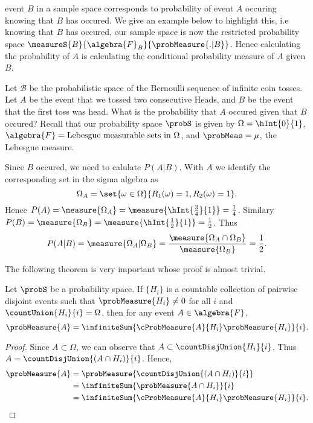 event $B$ in a sample space corresponds to probability of event $A$ occuring knowing that $B$ has occured. We
give an example below to highlight this, i.e knowing that $B$ has occured, our sample space is now the
restricted probability space $\measureS{B}{\algebra{F}_{B}}{\probMeasure{.|B}}$. Hence calculating the
probability of $A$ is calculating the conditional probability measure of $A$ given $B$.
\begin{Example}\label{ex:independece_2_events}
    Let $\mathcal{B}$ be the probabilistic space of the Bernoulli sequence of infinite coin tosses. Let $A$ be
    the event that we tossed two consecutive Heads, and $B$ be the event that the first toss was head. What is
    the probability that $A$ occured given that $B$ occured? Recall that our  probability space $\probS$ 
    is given by $\Omega = \hInt{0}{1}$, $\algebra{F} = \text{Lebesgue measurable sets in $\Omega$}$, 
    and $\probMeas = \mu$, the Lebesgue measure.

    Since $B$ occured, we need to calulate $P(A|B)$. With $A$ we identify the corresponding set in the sigma
    algebra as \[\Omega_{A} = \set{\omega\in\Omega}{R_1(\omega) = 1,R_2(\omega) =1}.\]
    Hence $P(A) = \measure{\Omega_{A}} = \measure{\hInt{\frac{3}{4}}{1}} = \frac{1}{4}$.
    Similary $P(B) = \measure{\Omega_{B}} = \measure{\hInt{\frac{1}{2}}{1}} = \frac{1}{2}$.
    Thus \[P(A | B) = \measure{\Omega_A|\Omega_B} = 
	\frac{\measure{\Omega_{A} \cap \Omega_{B}}}{\measure{\Omega_{B}}} = \frac{1}{2}.\]
\end{Example}
The following theorem is very important whose proof is almost trivial.
\begin{Theorem}[name=Total probability theorem]\label{thm:total_prob_thm}
    Let $\probS$ be a probability space. If $\lbrace H_i \rbrace $ is a countable collection of pairwise
    disjoint events such that $\probMeasure{H_i} \neq 0$ for all $i$ and $\countUnion{H_i}{i} = \Omega$, 
    then for any event $A \in \algebra{F}$,
    \[\probMeasure{A} = \infiniteSum{\cProbMeasure{A}{H_i}\probMeasure{H_i}}{i}.\]
\end{Theorem}
\begin{proof}
    Since $A \subset \Omega$, we can observe that $ A \subset \countDisjUnion{H_i}{i}$. 
    Thus $A = \countDisjUnion{(A\cap H_i)}{i}$.
    Hence,
    \begin{align*}
	\probMeasure{A} &= \probMeasure{\countDisjUnion{(A\cap H_i)}{i}} \\
	& = \infiniteSum{\probMeasure{A\cap H_i}}{i} \\
	& = \infiniteSum{\cProbMeasure{A}{H_i}\probMeasure{H_i}}{i}.
    \end{align*}
\end{proof}
